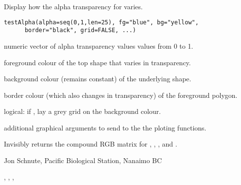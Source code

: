 \documentclass[letterpaper]{book}
\begin{document}
\begin{Description}\relax
Display how the alpha transparency for  varies.
\end{Description}
\begin{Usage}
\begin{verbatim}
testAlpha(alpha=seq(0,1,len=25), fg="blue", bg="yellow",
      border="black", grid=FALSE, ...)
\end{verbatim}
\end{Usage}
\begin{Arguments}
\begin{ldescription}
\item[\code{alpha}] numeric vector of alpha transparency values values from 0 to 1. 
\item[\code{fg}] foreground colour of the top shape that varies in transparency. 
\item[\code{bg}] background colour (remains constant) of the underlying shape. 
\item[\code{border}] border colour (which also changes in transparency) of the foreground polygon. 
\item[\code{grid}] logical: if , lay a grey grid on the background colour. 
\item[\code{...}] additional graphical arguments to send to the the ploting functions. 
\end{ldescription}
\end{Arguments}
\begin{Value}
Invisibly returns the compound RGB matrix for , , 
, and .
\end{Value}
\begin{Author}\relax
Jon Schnute, Pacific Biological Station, Nanaimo BC
\end{Author}
\begin{SeeAlso}\relax
{}, , , 
\end{SeeAlso}
\end{document}
